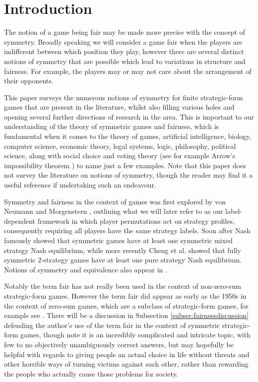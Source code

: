 \section{Introduction} \label{sec:intro}
The notion of a game being fair may be made more precise with the concept of symmetry. Broadly speaking we will consider a game fair when the players are indifferent between which position they play, however there are several distinct notions of symmetry that are possible which lead to variations in structure and fairness. For example, the players may or may not care about the arrangement of their opponents. 

This paper surveys the numerous notions of symmetry for finite strategic-form games that are present in the literature, whilst also filling various holes and opening several further directions of research in the area. This is important to our understanding of the theory of symmetric games and fairness, which is fundamental when it comes to the theory of games, artificial intelligence, biology, computer science, economic theory, legal systems, logic, philosophy, political science, along with social choice and voting theory (see for example Arrow's impossibility theorem \cite{arrow1950difficulty, arrow2012social}) to name just a few examples. Note that this paper does not survey the literature on notions of symmetry, though the reader may find it a useful reference if undertaking such an endeavour. 

Symmetry and fairness in the context of games was first explored by von Neumann and Morgenstern \cite{VNM}, outlining what we will later refer to as our label-dependent framework in which player permutations act on strategy profiles, consequently requiring all players have the same strategy labels. Soon after Nash \cite{NashNCG} famously showed that symmetric games have at least one symmetric mixed strategy Nash equilibrium, while more recently Cheng et al. \cite{CRVWSym} showed that fully symmetric $2$-strategy games have at least one pure strategy Nash equilibrium. Notions of symmetry and equivalence also appear in \cite{HarsanyiSelten}.

Notably the term fair has not really been used in the context of non-zero-sum strategic-form games. However the term fair did appear as early as the 1950s in the context of zero-sum games, which are a subclass of strategic-form games, for example see \cite{VNM, gelbaum1959symmetric, tucker1962comb}. There will be a discussion in Subsection \ref{subsec:fairnessdiscussion} defending the author's use of the term fair in the context of symmetric strategic-form games, though note it is an incredibly complicated and intricate topic, with few to no objectively unambiguously correct answers, but may hopefully be helpful with regards to giving people an actual choice in life without threats and other horrible ways of turning victims against each other, rather than rewarding the people who actually cause those problems for society.

